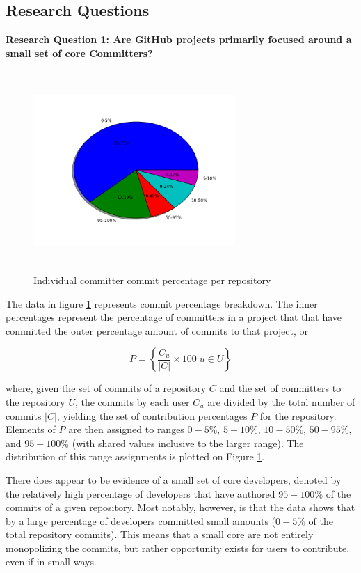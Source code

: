 \documentclass{proc}
\begin{document}
\subsection{Research Questions}
\textbf{Research Question 1: Are GitHub projects primarily focused around a small set of core Committers?}\\
\begin{figure}
\includegraphics[height=3in,width=3in]{images/committers_percentage_pie_chart.png}
\caption{Individual committer commit percentage per repository}
\label{fig:committers_percentage_pie_chart}
\end{figure}
The data in figure \ref{fig:committers_percentage_pie_chart} represents commit percentage breakdown. The inner percentages represent the percentage of committers in a project that that have committed the outer percentage amount of commits to that project, or

 \[ P = \left\{ \frac{ C_u } { |C| } \times 100 \Big| u \in U \right\} \]

where, given the set of commits of a repository $C$ and the set of committers to the repository $U$, the commits by each user $C_u$ are divided by the total number of commits $|C|$, yielding the set of contribution percentages $P$ for the repository. Elements of $P$ are then assigned to ranges $0-5\%$, $5-10\%$, $10-50\%$, $50-95\%$, and $95-100\%$ (with shared values inclusive to the larger range). The distribution of this range assignments is plotted on Figure \ref{fig:committers_percentage_pie_chart}.

There does appear to be evidence of a small set of core developers, denoted by the relatively high percentage of developers that have authored $95-100\%$ of the commits of a given repository. Most notably, however, is that the data shows that by a large percentage of developers committed small amounts ($0-5\%$ of the total repository commits). This means that a small core are not entirely monopolizing the commits, but rather opportunity exists for users to contribute, even if in small ways.
\end{document}
